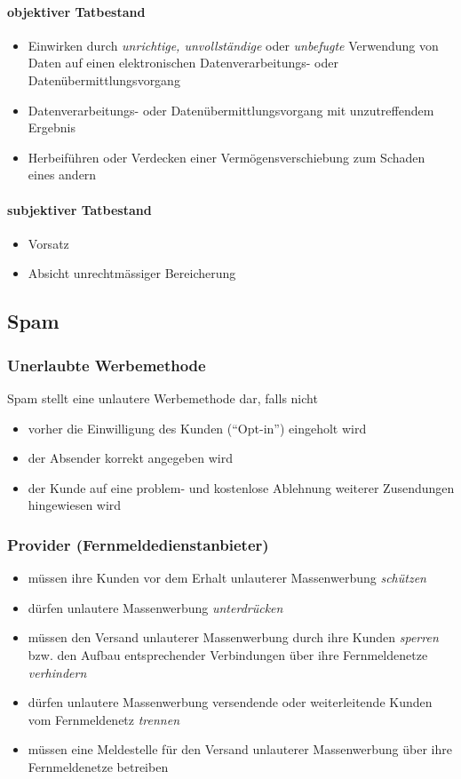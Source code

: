 \paragraph{objektiver Tatbestand}
\begin{itemize}
    \item Einwirken durch \textit{unrichtige, unvollständige} oder \textit{unbefugte} Verwendung von Daten auf einen elektronischen Datenverarbeitungs- oder Datenübermittlungsvorgang
    \item Datenverarbeitungs- oder Datenübermittlungsvorgang mit unzutreffendem Ergebnis
    \item Herbeiführen oder Verdecken einer Vermögensverschiebung zum Schaden eines andern
\end{itemize}

\paragraph{subjektiver Tatbestand}
\begin{itemize}
    \item Vorsatz
    \item Absicht unrechtmässiger Bereicherung
\end{itemize}

\subsection{Spam}

\subsubsection{Unerlaubte Werbemethode}
Spam stellt eine unlautere Werbemethode dar, falls nicht
\begin{itemize}
    \item vorher die Einwilligung des Kunden (“Opt-in”) eingeholt wird
    \item der Absender korrekt angegeben wird
    \item der Kunde auf eine problem- und kostenlose Ablehnung weiterer Zusendungen hingewiesen wird
\end{itemize}

\subsubsection{Provider (Fernmeldedienstanbieter)}
\begin{itemize}
    \item müssen ihre Kunden vor dem Erhalt unlauterer Massenwerbung \textit{schützen}
    \item dürfen unlautere Massenwerbung \textit{unterdrücken}
    \item müssen den Versand unlauterer Massenwerbung durch ihre Kunden \textit{sperren} bzw. den Aufbau entsprechender Verbindungen über ihre Fernmeldenetze \textit{verhindern}
    \item dürfen unlautere Massenwerbung versendende oder weiterleitende Kunden vom Fernmeldenetz \textit{trennen}
    \item müssen eine Meldestelle für den Versand unlauterer Massenwerbung über ihre Fernmeldenetze betreiben
\end{itemize}
